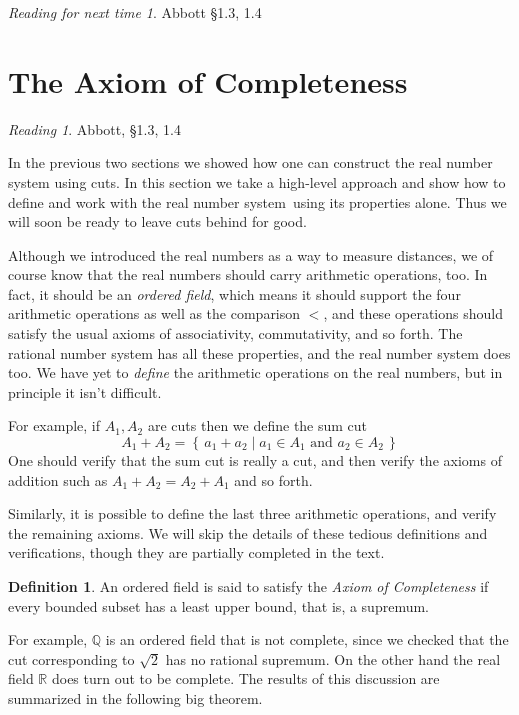 \documentclass[11pt,oneside]{amsbook}
\newcommand{\set}[1]{\left\{\,#1\,\right\}}
\newcommand{\Q}{\mathbb Q}
\newcommand{\R}{\mathbb R}
\theoremstyle{definition}
\theoremstyle{plain}
\theoremstyle{definition}
\newtheorem{definition}[theorem]{Definition}
\theoremstyle{remark}
\newtheorem*{reading}{Reading}
\newtheorem*{readnext}{Reading for next time}
\numberwithin{equation}{section}
\numberwithin{figure}{section}
\begin{document}
\vspace{\fill}
\begin{readnext}
  Abbott \S 1.3, 1.4
\end{readnext}


\newpage
\section{The Axiom of Completeness}

\begin{reading}
  Abbott, \S 1.3, 1.4
\end{reading}

In the previous two sections we showed how one can construct the real number system using cuts. In this section we take a high-level approach and show how to define and work with the real number system using its properties alone. Thus we will soon be ready to leave cuts behind for good.

Although we introduced the real numbers as a way to measure distances, we of course know that the real numbers should carry arithmetic operations, too. In fact, it should be an \emph{ordered field}, which means it should support the four arithmetic operations as well as the comparison $<$, and these operations should satisfy the usual axioms of associativity, commutativity, and so forth. The rational number system has all these properties, and the real number system does too. We have yet to \emph{define} the arithmetic operations on the real numbers, but in principle it isn't difficult.

For example, if $A_1,A_2$ are cuts then we define the sum cut
\[A_1+A_2=\set{a_1+a_2\mid a_1\in A_1\text{ and }a_2\in A_2}
\]
One should verify that the sum cut is really a cut, and then verify the axioms of addition such as $A_1+A_2=A_2+A_1$ and so forth.

Similarly, it is possible to define the last three arithmetic operations, and verify the remaining axioms. We will skip the details of these tedious definitions and verifications, though they are partially completed in the text.

\begin{definition}
  An ordered field is said to satisfy the \emph{Axiom of Completeness} if every bounded subset has a least upper bound, that is, a supremum.
\end{definition}

For example, $\Q$ is an ordered field that is not complete, since we checked that the cut corresponding to $\sqrt2$ has no rational supremum. On the other hand the real field $\R$ does turn out to be complete. The results of this discussion are summarized in the following big theorem.
\end{document}
